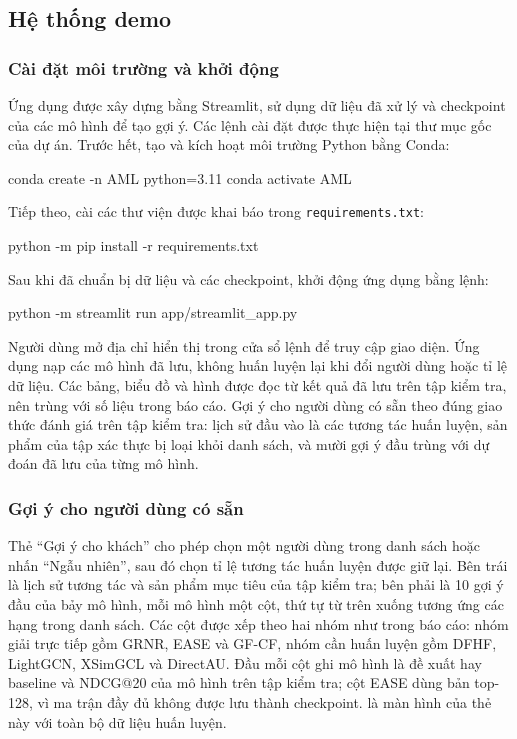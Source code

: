 \FloatBarrier
\subsection{Hệ thống demo}
\label{sec:demo}

\subsubsection{Cài đặt môi trường và khởi động}

Ứng dụng được xây dựng bằng Streamlit, sử dụng dữ liệu đã xử lý và checkpoint của các mô hình để tạo gợi ý. Các lệnh cài đặt được thực hiện tại thư mục gốc của dự án. Trước hết, tạo và kích hoạt môi trường Python bằng Conda:

\begin{DemoCommand}
conda create -n AML python=3.11
conda activate AML
\end{DemoCommand}

Tiếp theo, cài các thư viện được khai báo trong \texttt{requirements.txt}:

\begin{DemoCommand}
python -m pip install -r requirements.txt
\end{DemoCommand}

Sau khi đã chuẩn bị dữ liệu và các checkpoint, khởi động ứng dụng bằng lệnh:

\begin{DemoCommand}
python -m streamlit run app/streamlit_app.py
\end{DemoCommand}

Người dùng mở địa chỉ hiển thị trong cửa sổ lệnh để truy cập giao diện. Ứng dụng nạp các mô hình đã lưu, không huấn luyện lại khi đổi người dùng hoặc tỉ lệ dữ liệu. Các bảng, biểu đồ và hình được đọc từ kết quả đã lưu trên tập kiểm tra, nên trùng với số liệu trong báo cáo. Gợi ý cho người dùng có sẵn theo đúng giao thức đánh giá trên tập kiểm tra: lịch sử đầu vào là các tương tác huấn luyện, sản phẩm của tập xác thực bị loại khỏi danh sách, và mười gợi ý đầu trùng với dự đoán đã lưu của từng mô hình.

\FloatBarrier
\subsubsection{Gợi ý cho người dùng có sẵn}

Thẻ ``Gợi ý cho khách'' cho phép chọn một người dùng trong danh sách hoặc nhấn ``Ngẫu nhiên'', sau đó chọn tỉ lệ tương tác huấn luyện được giữ lại. Bên trái là lịch sử tương tác và sản phẩm mục tiêu của tập kiểm tra; bên phải là 10 gợi ý đầu của bảy mô hình, mỗi mô hình một cột, thứ tự từ trên xuống tương ứng các hạng trong danh sách. Các cột được xếp theo hai nhóm như trong báo cáo: nhóm giải trực tiếp gồm GRNR, EASE và GF-CF, nhóm cần huấn luyện gồm DFHF, LightGCN, XSimGCL và DirectAU. Đầu mỗi cột ghi mô hình là đề xuất hay baseline và NDCG@20 của mô hình trên tập kiểm tra; cột EASE dùng bản top-128, vì ma trận đầy đủ không được lưu thành checkpoint.  là màn hình của thẻ này với toàn bộ dữ liệu huấn luyện.


